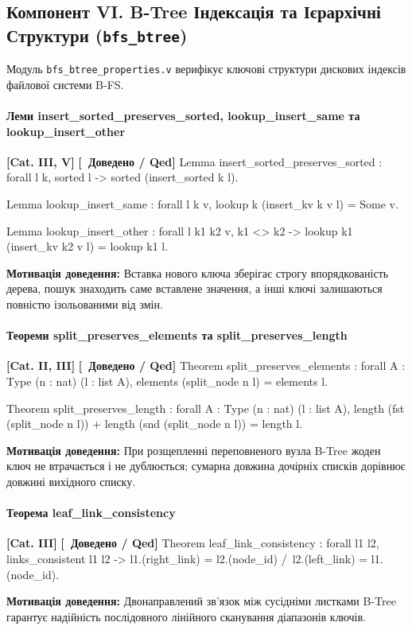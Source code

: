 \documentclass{article}
\let\originalfootnotesize\footnotesize
\let\oldverbatim\verbatim
\let\oldendverbatim\endverbatim
\renewenvironment{verbatim}{\originalfootnotesize\oldverbatim}{\oldendverbatim}
\newcommand{\thmcategory}[1]{{\small\textbf{\color{coreblue}[#1]}}}
\newcommand{\thmproven}{{\small\textbf{\color{productgreen}[\checkmark\ Доведено / Qed]}}}
\newcommand{\thmmotivation}[1]{%
  \par\smallskip\noindent\colorbox{boxbg}{\parbox{\dimexpr\linewidth-2\fboxsep\relax}{%
    \small\textbf{Мотивація доведення:} #1%
  }}\par\medskip
}
\begin{document}
\subsection[Компонент VI. B-Tree Індексація]{Компонент VI. B-Tree Індексація та Ієрархічні Структури (\texttt{bfs\_btree})}

Модуль \texttt{bfs\_btree\_properties.v} верифікує ключові структури дискових індексів файлової системи B-FS.

\paragraph{Леми insert\_sorted\_preserves\_sorted, lookup\_insert\_same та lookup\_insert\_other} \thmcategory{Cat. III, V} \thmproven
\begin{verbatim}
Lemma insert_sorted_preserves_sorted : forall l k,
  sorted l -> sorted (insert_sorted k l).

Lemma lookup_insert_same : forall l k v,
  lookup k (insert_kv k v l) = Some v.

Lemma lookup_insert_other : forall l k1 k2 v,
  k1 <> k2 -> lookup k1 (insert_kv k2 v l) = lookup k1 l.
\end{verbatim}
\thmmotivation{Вставка нового ключа зберігає строгу впорядкованість дерева, пошук знаходить саме вставлене значення, а інші ключі залишаються повністю ізольованими від змін.}

\paragraph{Теореми split\_preserves\_elements та split\_preserves\_length} \thmcategory{Cat. II, III} \thmproven
\begin{verbatim}
Theorem split_preserves_elements : forall {A : Type} (n : nat) (l : list A),
  elements (split_node n l) = elements l.

Theorem split_preserves_length : forall {A : Type} (n : nat) (l : list A),
  length (fst (split_node n l)) + length (snd (split_node n l)) = length l.
\end{verbatim}
\thmmotivation{При розщепленні переповненого вузла B-Tree жоден ключ не втрачається і не дублюється; сумарна довжина дочірніх списків дорівнює довжині вихідного списку.}

\paragraph{Теорема leaf\_link\_consistency} \thmcategory{Cat. III} \thmproven
\begin{verbatim}
Theorem leaf_link_consistency : forall l1 l2,
  links_consistent l1 l2 ->
  l1.(right_link) = l2.(node_id) /\ l2.(left_link) = l1.(node_id).
\end{verbatim}
\thmmotivation{Двонаправлений зв'язок між сусідніми листками B-Tree гарантує надійність послідовного лінійного сканування діапазонів ключів.}
\end{document}
